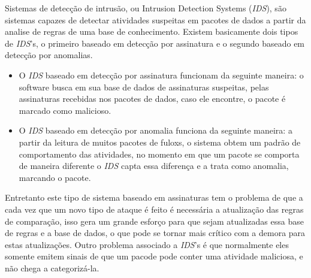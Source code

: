 
Sistemas de detecção de intrusão, ou Intrusion Detection Systems (\textit{IDS}), são sistemas capazes de detectar atividades suspeitas em pacotes de dados a partir da analise de regras de uma base de conhecimento. Existem basicamente dois tipos de \textit{IDS}'s, o primeiro baseado em detecção por assinatura e o segundo baseado em detecção por anomalias.

\begin{itemize}
    \item O \textit{IDS} baseado em detecção por assinatura funcionam da seguinte maneira: o software busca em sua base de dados de assinaturas suspeitas, pelas assinaturas recebidas nos pacotes de dados, caso ele encontre, o pacote é marcado como malicioso. \cite{rehman2003intrusion}
    \item O \textit{IDS} baseado em detecção por anomalia funciona da seguinte maneira: a partir da leitura de muitos pacotes de fuloxs, o sistema obtem um padrão de comportamento das atividades, no momento em que um pacote se comporta de maneira diferente o \textit{IDS} capta essa diferença e a trata como anomalia, marcando o pacote. \cite{debar2000introduction}
\end{itemize}


Entretanto este tipo de sistema baseado em assinaturas tem o problema de que a cada vez que um novo tipo de ataque é feito é necessária a atualização das regras de comparação, isso gera um grande esforço para que sejam atualizadas essa base de regras e a base de dados, o que pode se tornar mais crítico com a demora para estas atualizações. Outro problema associado a \textit{IDS}'s é que normalmente eles somente emitem sinais de que um pacode pode conter uma atividade maliciosa, e não chega a categorizá-la.

